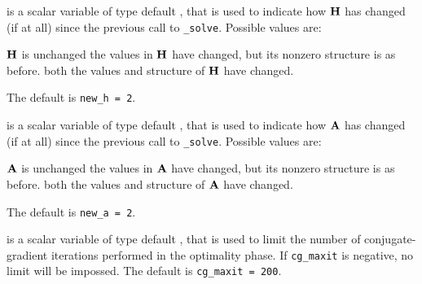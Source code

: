 \begin{description}





 is a scalar variable of type default \integer, that is used
to indicate how ${\mathbf{H}}$ has changed (if at all) since the previous call
to {\tt \packagename\_solve}. Possible values are:
\begin{description}
 ${\mathbf{H}}$ is unchanged
 the values in ${\mathbf{H}}$ have changed, but its nonzero structure 
is as before.
 both the values and structure of ${\mathbf{H}}$ have changed.
\end{description}
The default is {\tt new\_h = 2}.

 is a scalar variable of type default \integer, that is used
to indicate how ${\mathbf{A}}$ has changed (if at all) since the previous call
to {\tt \packagename\_solve}. Possible values are:
\begin{description}
 ${\mathbf{A}}$ is unchanged
 the values in ${\mathbf{A}}$ have changed, but its nonzero structure 
is as before.
 both the values and structure of ${\mathbf{A}}$ have changed.
\end{description}
The default is {\tt new\_a = 2}.

 is a scalar variable of type default \integer, that is used
to limit the number of conjugate-gradient iterations performed in 
the optimality phase. If 
{\tt cg\_maxit} is negative, no limit will be impossed. The default
is {\tt cg\_maxit = 200}.


\end{description}
